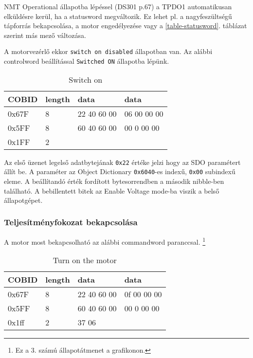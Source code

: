 
NMT Operational állapotba lépéssel (DS301 p.67) a TPDO1 automatikusan elküldésre kerül, ha a statusword megváltozik. Ez lehet pl. a nagyfeszültségű tápforrás bekapcsolása, a motor engedélyezése vagy a \ref{table-statusword}. táblázat szerint más mező változása.

A motorvezérlő ekkor \texttt{switch on disabled} állapotban van. Az alábbi controlword beállítással \texttt{Switched ON} állapotba lépünk.
 
\begin{table}[H]
	\centering

	\renewcommand{\arraystretch}{2} %
	
	\begin{tabu}{|p{1.3cm}|p{1cm}|p{2cm}|p{2cm}|}
		\hline
		COBID & length & data & data
		\\ 		\hline
		0x67F & 8 & 22 40 60 00 & 06 00 00 00		
		\\		\hline
		0x5FF & 8 & 60 40 60 00 & 00 0 00 00
		\\		\hline
		0x1FF & 2 & &
		\\		\hline
	\end{tabu}
	\caption*{Switch on}
\end{table}

\begin{formal}
	Az első üzenet legelső adatbytejának \texttt{0x22} értéke jelzi hogy az SDO paramétert állít be. A paraméter az Object Dictionary \texttt{0x6040}-es indexű, \texttt{0x00} subindexű eleme. A beállítandó érték fordított bytesorrendben a második nibble-ben található. A bebillentett bitek az Enable Voltage mode-ba viszik a belső állapotgépet.
\end{formal}

\subsubsection{Teljesítményfokozat bekapcsolása}
A motor most bekapcsolható az alábbi commandword paranccsal. 
\footnote{Ez a 3. számú állapotátmenet a grafikonon.}

\begin{table}[H]
	\centering
	
	\renewcommand{\arraystretch}{2} %
	
	\begin{tabu}{|p{1.3cm}|p{1cm}|p{2cm}|p{2cm}|}
		\hline
		COBID & length & data & data
		\\ 		\hline
		0x67F & 8 & 22 40 60 00 & 0f 00 00 00		
		\\		\hline
		0x5FF & 8 & 60 40 60 00 & 00 0 00 00
		\\		\hline
		0x1ff & 2 & 37 06 &
		\\		\hline
	\end{tabu}
	\caption*{Turn on the motor}
\end{table}

